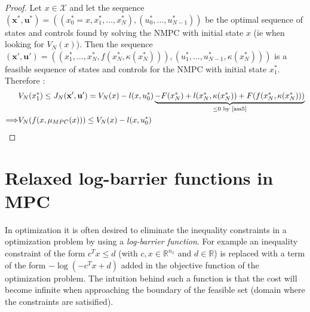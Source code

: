\documentclass[12pt]{article}
\numberwithin{theorem}{section} %
\theoremstyle{definition}
\theoremstyle{remark}
\def\cal#1{\mathcal{#1}}
\newcommand{\R}{\mathbb{R}}
\begin{document}
\begin{proof}
	Let $x\in\cal{X}$ and let the sequence $(\mathbf{x}^*,\mathbf{u}^*)=((x^*_0=x,x^*_1,\dots,x^*_N),(u_0^*,\dots,u^*_{N-1}))$ be the optimal sequence of states and controls found by solving the NMPC with initial state $x$ (ie when looking for $V_N(x)$).
	Then the sequence $(\mathbf{x}',\mathbf{u}')=((x^*_1,\dots,x^*_N,f(x^*_N,\kappa(x^*_N))),(u_1^*,\dots,u^*_{N-1},\kappa(x^*_{N})))$ 
	is a feasible sequence of states and controls for the NMPC with initial state $x^*_1$.
	Therefore :
	\begin{align*}
		&V_N(x^*_1)\leq J_N(\mathbf{x}',\mathbf{u}')=V_N(x)-l(x,u^*_0)\underbrace{-F(x^*_N)+l(x^*_N,\kappa(x^*_N))+F(f(x^*_N,\kappa(x^*_N)))}_{\leq 0\text{ by \ref{ass5}}}\\
		\Longrightarrow &V_N(f(x,\mu_{MPC}(x)))\leq V_N(x)-l(x,u^*_0)
	\end{align*}
\end{proof}




\section{Relaxed log-barrier functions in MPC}
In optimization it is often desired to eliminate the inequality constraints in a optimization problem by using a \textit{log-barrier function}.
For example an inequality constraint of the form $c^Tx\leq d$ (with $c,x\in\R^{n_x}$ and $d\in\R$) is replaced with a term of the form $-\log(-c^Tx+d)$ added in the objective function of the optimization problem.
The intuition behind such a function is that the cost will become infinite when approaching the boundary of the feasible set (domain where the constraints are satisified).
\end{document}
